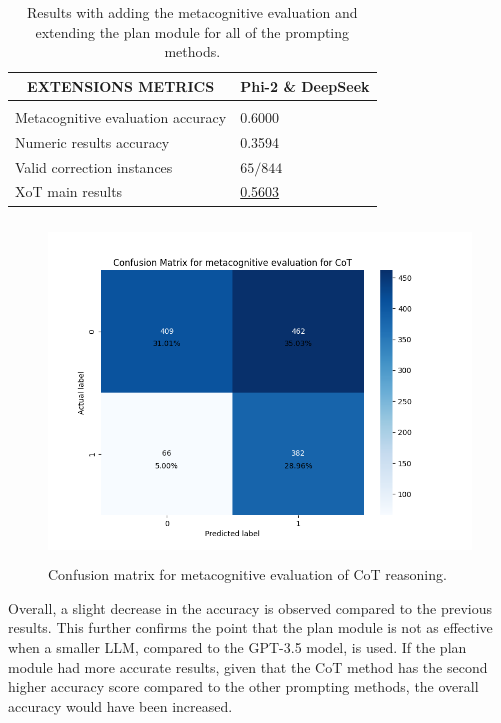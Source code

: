 \documentclass[10pt]{article} %
\begin{document}
\begin{table}[t]
  \caption{Results with adding the metacognitive evaluation and extending the plan module for all of the prompting methods.}
  \label{extension-results}
  \begin{center}
  \begin{tabular}{ll}
  \multicolumn{1}{c}{\bf EXTENSIONS METRICS}  &\multicolumn{1}{c}{\bf Phi-2 \& DeepSeek}
  \\ \hline \\
  Metacognitive evaluation accuracy        &0.6000\\
  Numeric results accuracy                 &0.3594\\
  Valid correction instances               &$65/844$\\
  XoT main results                         &\underline{0.5603}\\
  \end{tabular}
  \end{center}
  \end{table}

  \begin{figure}[h]
    \begin{center}
      \includegraphics[height=9cm]{graphs/cm_metacognitive_cot.png}
      \end{center}
      \caption{Confusion matrix for metacognitive evaluation of CoT reasoning.}
      \label{fig:cm-metacognitive}
    \end{figure}

Overall, a slight decrease in the accuracy is observed compared to the previous results. This further confirms the point that the plan module is not as effective when a smaller LLM, compared to the GPT-3.5 model, is used. If the plan module had more accurate results, given that the CoT method has the second higher accuracy score compared to the other prompting methods, the overall accuracy would have been increased. 
\end{document}
